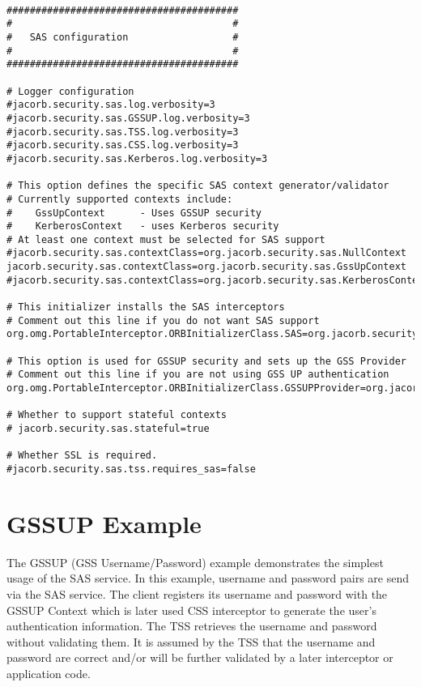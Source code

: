 \begin{scriptsize}
\begin{verbatim}

########################################
#                                      #
#   SAS configuration                  #
#                                      #
########################################

# Logger configuration
#jacorb.security.sas.log.verbosity=3
#jacorb.security.sas.GSSUP.log.verbosity=3
#jacorb.security.sas.TSS.log.verbosity=3
#jacorb.security.sas.CSS.log.verbosity=3
#jacorb.security.sas.Kerberos.log.verbosity=3

# This option defines the specific SAS context generator/validator
# Currently supported contexts include:
#    GssUpContext      - Uses GSSUP security
#    KerberosContext   - uses Kerberos security
# At least one context must be selected for SAS support
#jacorb.security.sas.contextClass=org.jacorb.security.sas.NullContext
jacorb.security.sas.contextClass=org.jacorb.security.sas.GssUpContext
#jacorb.security.sas.contextClass=org.jacorb.security.sas.KerberosContext

# This initializer installs the SAS interceptors
# Comment out this line if you do not want SAS support
org.omg.PortableInterceptor.ORBInitializerClass.SAS=org.jacorb.security.sas.SASInitializer

# This option is used for GSSUP security and sets up the GSS Provider
# Comment out this line if you are not using GSS UP authentication
org.omg.PortableInterceptor.ORBInitializerClass.GSSUPProvider=org.jacorb.security.sas.GSSUPProviderInitializer

# Whether to support stateful contexts
# jacorb.security.sas.stateful=true

# Whether SSL is required.
#jacorb.security.sas.tss.requires_sas=false
\end{verbatim}
\end{scriptsize}


\section{GSSUP Example}

The GSSUP (GSS Username/Password) example demonstrates the simplest
usage of the SAS service. In this example, username and password
pairs are send via the SAS service. The client registers its username
and password with the GSSUP Context which is later used CSS interceptor
to generate the user's authentication information.
The TSS retrieves the username and password
without validating them. It is assumed by the TSS that the username
and password are correct and/or will be further validated by a later
interceptor or application code.

